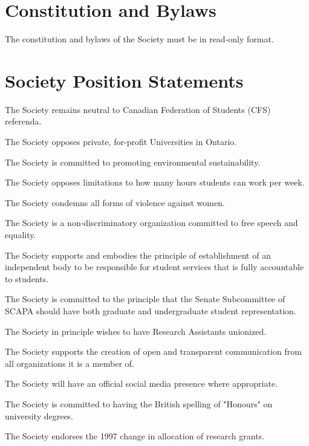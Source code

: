 \section{Constitution and Bylaws}
\begin{longenum}[ label*=\thesection.\arabic*., align=left]
\item The constitution and bylaws of the Society must be in read-only format.
\end{longenum}

\section{Society Position Statements}
\begin{longenum}[ label*=\thesection.\arabic*., align=left]
\item The Society remains neutral to Canadian Federation of Students (CFS) referenda.
\item The Society opposes private, for-profit Universities in Ontario.
\item The Society is committed to promoting environmental sustainability.
\item The Society opposes limitations to how many hours students can work per week.
\item The Society condemns all forms of violence against women.
\item The Society is a non-discriminatory organization committed to free speech and equality.
\item The Society supports and embodies the principle of establishment of an independent body to be responsible for student services that is fully accountable to students.
\item The Society is committed to the principle that the Senate Subcommittee of SCAPA should have both graduate and undergraduate student representation.
\item The Society in principle wishes to have Research Assistants unionized.
\item The Society supports the creation of open and transparent communication from all organizations it is a member of.
\item The Society will have an official social media presence where appropriate.
\item The Society is committed to having the British spelling of "Honours" on
university degrees.
\item The Society endorses the 1997 change in allocation of research grants.
\end{longenum}